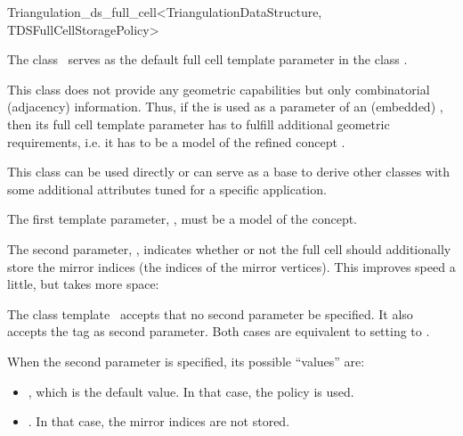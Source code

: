 \begin{ccRefClass}{Triangulation_ds_full_cell<TriangulationDataStructure, TDSFullCellStoragePolicy>}

\ccDefinition

The class \ccRefName\ serves as the default full cell template parameter in the
class .

This class does not provide any geometric capabilities but only combinatorial
(adjacency) information. Thus, if the  is
used as a parameter of an (embedded) , then its full cell template
parameter has to fulfill additional geometric requirements, i.e. it has to be
a model of the refined concept .

This class can be used directly or can serve as a base to derive other classes
with some additional attributes tuned for a specific application.


\ccParameters

The first template parameter, , must be a model of the
 concept. 

The second parameter, , indicates whether or not
the full cell should additionally store the mirror indices (the indices
 of the mirror vertices). This improves speed a little, but takes
more space:

The class template \ccRefName\ accepts that no second parameter be specified.
It also accepts the tag  as second parameter. Both cases are
equivalent to setting  to
.

When the second parameter is specified, its possible ``values''
are:\begin{itemize}

\item {}, which is the {default} value. In that case, the
policy  is used.

\item {}. In that case, the mirror
indices are {not stored}.


\end{itemize}
\end{ccRefClass}
